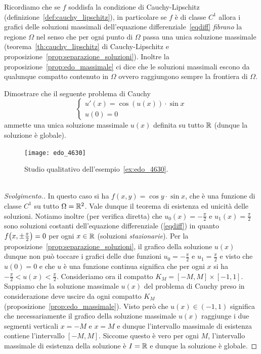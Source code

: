 Ricordiamo che se $f$ soddisfa la condizione di Cauchy-Lipschitz
(definizione~\ref{def:cauchy_lipschitz}), in particolare
se $f$ è di classe $C^1$ allora i grafici delle soluzioni
massimali dell'equazione differenziale~\eqref{eqdiff}
\emph{fibrano} la regione $\Omega$ nel senso che per ogni punto di
$\Omega$ passa una unica soluzione massimale (teorema~\ref{th:cauchy_lipschitz}
di Cauchy-Lipschitz e proposizione~\ref{prop:separazione_soluzioni}).
Inoltre la proposizione~\ref{prop:edo_massimale} ci dice
che le soluzioni massimali escono da qualunque compatto contenuto in
$\Omega$ ovvero raggiungono sempre la frontiera di $\Omega$.

\begin{example}\label{ex:edo_4630}
Dimostrare che il seguente problema di Cauchy
\[
	\begin{cases}
		u'(x) = \cos(u(x))\cdot \sin x \\
		u(0) = 0
	\end{cases}
\]
ammette una unica soluzione massimale $u(x)$
definita su tutto ${\mathbb R}$ (dunque la soluzione è globale).
\end{example}
\newsavebox{\qredoquattro}
\begin{figure}
  \centering\texttt{[image: edo\_4630]}
  \caption{Studio qualitativo dell'esempio~\ref{ex:edo_4630}.
  \ifwidemargin\\\\\fi%
  \usebox{\qredoquattro}}
  \label{fig:edo_4630}
\end{figure}
%
\begin{proof}[Svolgimento.]
In questo caso si ha $f(x,y)=\cos y\cdot \sin x$, che \`e una funzione
di classe $C^1$ su tutto $\Omega={\mathbb R}^2$.
Vale dunque il teorema di esistenza ed
unicità delle soluzioni.
Notiamo inoltre (per verifica diretta)
che $u_0(x)=-\frac \pi 2$ e $u_1(x)=\frac \pi 2$ sono
soluzioni costanti dell'equazione differenziale (\ref{eqdiff})
in quanto $f{\left( x,\pm\frac \pi 2 \right)}=0$ per ogni $x\in {\mathbb R}$
(soluzioni \emph{stazionarie}).
Per la proposizione~\ref{prop:separazione_soluzioni},
il grafico della soluzione $u(x)$ dunque
non può toccare i grafici delle due funzioni $u_0=-\frac \pi 2$ e $u_1=\frac \pi 2$ e visto
che $u(0)=0$ e che $u$ è una funzione continua significa
che per ogni $x$ si ha $-\frac \pi 2 < u(x) < \frac \pi 2$.
Consideriamo ora il compatto
$K_M=[-M,M] \times [-1,1]$.
Sappiamo che la soluzione
massimale $u(x)$ del problema di Cauchy preso in considerazione deve
uscire da ogni compatto $K_M$
(proposizione~\ref{prop:edo_massimale}).
Visto però che $u(x)\in (-1,1)$ significa che necessariamente
il grafico della soluzione massimale $u(x)$
raggiunge i due segmenti verticali
$x=-M$ e $x=M$ e dunque l'intervallo massimale di esistenza
contiene l'intervallo $[-M,M]$.
Siccome questo è vero per ogni $M$, l'intervallo massimale
di esistenza della soluzione è $I={\mathbb R}$ e dunque la soluzione
è globale.
\end{proof}

